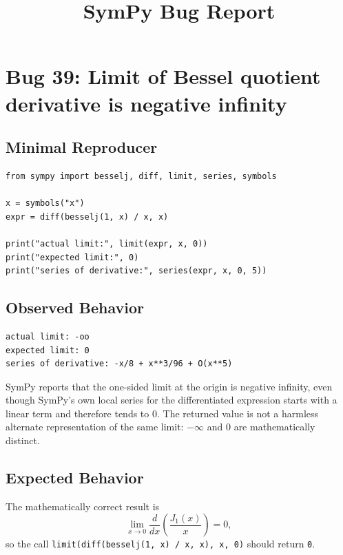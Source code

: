 \documentclass[11pt]{article}
\title{SymPy Bug Report}
\author{}
\date{}
\begin{document}
\maketitle

\section{Bug 39: Limit of Bessel quotient derivative is negative infinity}

\subsection{Minimal Reproducer}

\medskip

\begin{lstlisting}[style=bugpython]
from sympy import besselj, diff, limit, series, symbols

x = symbols("x")
expr = diff(besselj(1, x) / x, x)

print("actual limit:", limit(expr, x, 0))
print("expected limit:", 0)
print("series of derivative:", series(expr, x, 0, 5))
\end{lstlisting}

\subsection{Observed Behavior}

\medskip

\begin{lstlisting}[style=bugpython]
actual limit: -oo
expected limit: 0
series of derivative: -x/8 + x**3/96 + O(x**5)
\end{lstlisting}

SymPy reports that the one-sided limit at the origin is negative infinity, even
though SymPy's own local series for the differentiated expression starts with a
linear term and therefore tends to \(0\). The returned value is not a harmless
alternate representation of the same limit: \(-\infty\) and \(0\) are
mathematically distinct.

\subsection{Expected Behavior}

The mathematically correct result is
\[
    \lim_{x\to 0}\frac{d}{dx}\left(\frac{J_1(x)}{x}\right)=0,
\]
so the call \texttt{limit(diff(besselj(1, x) / x, x), x, 0)} should return
\texttt{0}.
\end{document}
